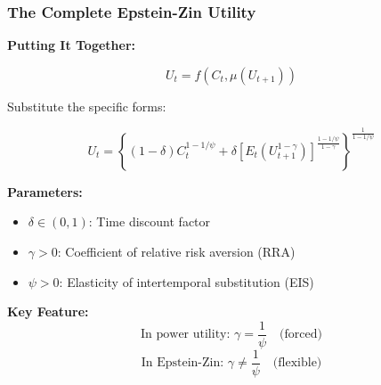 \documentclass{beamer}
\begin{document}
\begin{frame}[shrink=18]
    \frametitle{The Complete Epstein-Zin Utility}
    
    \textbf{Putting It Together:}
    
    \begin{equation*}
        U_t = f(C_t, \mu(U_{t+1}))
    \end{equation*}
    
    Substitute the specific forms:
    
    \begin{tcolorbox}[colback=green!5!white, colframe=green!75!black, title=Epstein-Zin Utility Function]
    \begin{equation*}
        U_t = \left\{ (1-\delta)C_t^{1-1/\psi} + \delta \left[ E_t(U_{t+1}^{1-\gamma}) \right]^{\frac{1-1/\psi}{1-\gamma}} \right\}^{\frac{1}{1-1/\psi}}
    \end{equation*}
    \end{tcolorbox}
    
    
    \textbf{Parameters:}
    \begin{itemize}
        \item $\delta \in (0,1)$: Time discount factor
        \item $\gamma > 0$: Coefficient of relative risk aversion (RRA)
        \item $\psi > 0$: Elasticity of intertemporal substitution (EIS)
    \end{itemize}
    
    
    \textbf{Key Feature:}
    \begin{equation*}
        \text{In power utility: } \gamma = \frac{1}{\psi} \quad \text{(forced)}
    \end{equation*}
    \begin{equation*}
        \text{In Epstein-Zin: } \gamma \neq \frac{1}{\psi} \quad \text{(flexible)}
    \end{equation*}
    
\end{frame}
\end{document}
